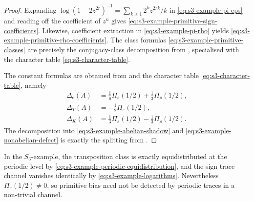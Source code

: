 \begin{proof}
  Expanding \(\log(1-2z^{2r})^{-1}=\sum_{k\ge 1}2^k z^{2rk}/k\) in
  \eqref{eq:s3-example-pi-eps} and reading off the coefficient of
  \(z^n\) gives \eqref{eq:s3-example-primitive-sign-coefficients}.
  Likewise, coefficient extraction in \eqref{eq:s3-example-pi-rho}
  yields \eqref{eq:s3-example-primitive-rho-coefficients}. The class formulas
  \eqref{eq:s3-example-primitive-classes} are precisely the
  conjugacy-class decomposition from
  , specialised with the
  character table \eqref{eq:s3-character-table}.

  The constant formulas are obtained from
   and the character table
  \eqref{eq:s3-character-table}, namely
  \[
    \begin{aligned}
      \Delta_e(A)
      &=\frac{1}{6}\Pi_\varepsilon(1/2)+\frac{1}{3}\Pi_\rho(1/2), \\
      \Delta_T(A)
      &=-\frac{1}{2}\Pi_\varepsilon(1/2), \\
      \Delta_K(A)
      &=\frac{1}{3}\Pi_\varepsilon(1/2)-\frac{1}{3}\Pi_\rho(1/2).
    \end{aligned}
  \]
  The decomposition into
  \eqref{eq:s3-example-abelian-shadow} and
  \eqref{eq:s3-example-nonabelian-defect} is exactly the splitting from
  .
\end{proof}

\begin{remark}
  In the \(S_3\)-example, the transposition class is exactly
  equidistributed at the periodic level by
  \eqref{eq:s3-example-periodic-equidistribution}, and the sign trace
  channel vanishes identically by \eqref{eq:s3-example-logarithms}.
  Nevertheless \(\Pi_\varepsilon(1/2)\neq 0\), so primitive bias need
  not be detected by periodic traces in a non-trivial channel.
\end{remark}
